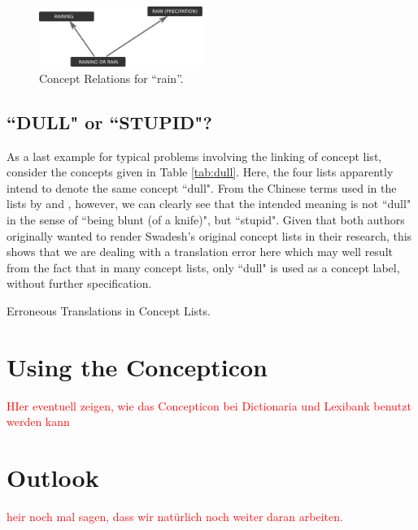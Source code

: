 \documentclass[10pt, a4paper]{article}
\begin{document}
  \begin{figure}[h]
  \includegraphics[width=0.475\textwidth]{img/rain.pdf}
  \caption{Concept Relations for ``rain''.}
  \label{fig:rain}
\end{figure}

\subsection{``DULL" or ``STUPID"?}

As a last example for typical problems involving the linking of concept list, consider the concepts
given in Table \ref{tab:dull}. Here, the four lists apparently intend to denote the same concept
``dull". From the Chinese terms used in the lists by  and ,
however, we can clearly see that the intended meaning is not ``dull" in the sense of ``being blunt
(of a knife)", but ``stupid". Given that both authors originally wanted to render Swadesh's original
concept lists in their research, this shows that we are dealing with a translation error here which
may well result from the fact that in many concept lists, only ``dull" is used as a concept label,
without further specification. 
 
\begin{table}[h]
    \caption{Erroneous Translations in Concept Lists.}
    \label{tab:dull}
  \end{table}

\section{Using the Concepticon}
\textcolor{red}{HIer eventuell zeigen, wie das Concepticon bei Dictionaria und Lexibank benutzt
werden kann}

\section{Outlook}
\textcolor{red}{heir noch mal sagen, dass wir natürlich noch weiter daran arbeiten.}



\free

\scriptsize

\end{document}

